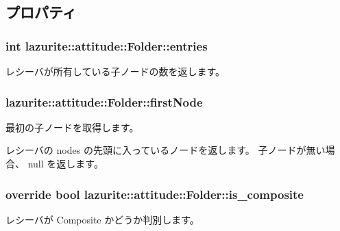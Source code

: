 \subsection{プロパティ}
\hypertarget{classlazurite_1_1attitude_1_1_folder_a0793a3e1e08125d8beebf4a546cdadf9}{
\subsubsection[{entries}]{\setlength{\rightskip}{0pt plus 5cm}int lazurite::attitude::Folder::entries}}
\label{classlazurite_1_1attitude_1_1_folder_a0793a3e1e08125d8beebf4a546cdadf9}
レシーバが所有している子ノードの数を返します。 \hypertarget{classlazurite_1_1attitude_1_1_folder_ae80d4b27826a3c12c4bf1a785947f82f}{
\subsubsection[{firstNode}]{ lazurite::attitude::Folder::firstNode}}
\label{classlazurite_1_1attitude_1_1_folder_ae80d4b27826a3c12c4bf1a785947f82f}
最初の子ノードを取得します。 
\begin{DoxyPre}
 レシーバの nodes の先頭に入っているノードを返します。
 子ノードが無い場合、 null を返します。
 \end{DoxyPre}
 \hypertarget{classlazurite_1_1attitude_1_1_folder_afcfe6dea96b826c40b4b99cf34888b0c}{
\subsubsection[{is\_\-composite}]{\setlength{\rightskip}{0pt plus 5cm}override bool lazurite::attitude::Folder::is\_\-composite}}
\label{classlazurite_1_1attitude_1_1_folder_afcfe6dea96b826c40b4b99cf34888b0c}
レシーバが Composite かどうか判別します。 

